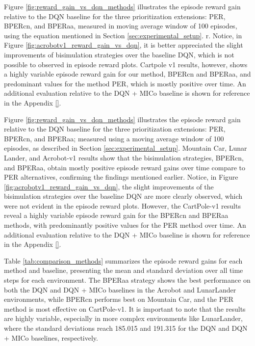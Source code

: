 Figure \ref{fig:reward_gain_vs_dqn_methods} illustrates the episode reward gain relative to the DQN baseline for the three prioritization extensions: PER, BPERcn, and BPERaa, measured in moving average window of 100 episodes, using the equation mentioned in Section \ref{sec:experimental_setup}. r. Notice, in Figure \ref{fig:acrobotv1_reward_gain_vs_dqn}, it is better appreciated the slight improvements of bisimulation strategies over the baseline DQN, which is not possible to observed in episode reward plots. Cartpole v1 results, however, shows a highly variable episode reward gain for our method, BPERcn and BPERaa, and predominant values for the method PER, which is mostly positive over time. An additional evaluation relative to the DQN + MICo baseline is shown for reference in the Appendix \ref{}.

Figure \ref{fig:reward_gain_vs_dqn_methods} illustrates the episode reward gain relative to the DQN baseline for the three prioritization extensions: PER, BPERcn, and BPERaa; measured using a moving average window of 100 episodes, as described in Section \ref{sec:experimental_setup}. Mountain Car, Lunar Lander, and Acrobot-v1 results show that the bisimulation strategies, BPERcn, and BPERaa, obtain mostly positive episode reward gains over time compare to PER alternatives, confirming the findings mentioned earlier. Notice, in Figure \ref{fig:acrobotv1_reward_gain_vs_dqn}, the slight improvements of the bisimulation strategies over the baseline DQN are more clearly observed, which were not evident in the episode reward plots. However, the CartPole-v1 results reveal a highly variable episode reward gain for the BPERcn and BPERaa methods, with predominantly positive values for the PER method over time. An additional evaluation relative to the DQN + MICo baseline is shown for reference in the Appendix \ref{}.

Table \ref{tab:comparison_methods} summarizes the episode reward gains for each method and baseline, presenting the mean and standard deviation over all time steps for each environment. The BPERaa strategy shows the best performance on both the DQN and DQN + MICo baselines in the Acrobot and LunarLander environments, while BPERcn performs best on Mountain Car, and the PER method is most effective on CartPole-v1. It is important to note that the results are highly variable, especially in more complex environments like LunarLander, where the standard deviations reach 185.015 and 191.315 for the DQN and DQN + MICo baselines, respectively. %

